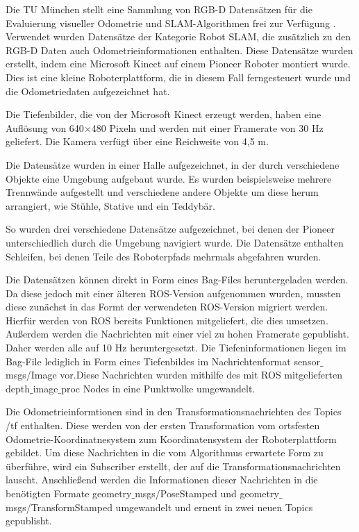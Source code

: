 Die TU München stellt eine Sammlung von RGB-D Datensätzen für die Evaluierung visueller Odometrie und SLAM-Algorithmen frei zur Verfügung \cite{Sturm2012}. Verwendet wurden Datensätze der Kategorie Robot SLAM, die zusätzlich zu den RGB-D Daten auch Odometrieinformationen enthalten. Diese Datensätze wurden erstellt, indem eine Microsoft Kinect auf einem Pioneer Roboter montiert wurde. Dies ist eine kleine Roboterplattform, die in diesem Fall ferngesteuert wurde und die Odometriedaten aufgezeichnet hat. 

Die Tiefenbilder, die von der Microsoft Kinect erzeugt werden, haben eine Auflösung von 640$\times$480 Pixeln und werden mit einer Framerate von 30 Hz geliefert. Die Kamera verfügt über eine Reichweite von 4,5 m.

Die Datensätze wurden in einer Halle aufgezeichnet, in der durch verschiedene Objekte eine Umgebung aufgebaut wurde. Es wurden beispielsweise mehrere Trennwände aufgestellt und verschiedene andere Objekte um diese herum arrangiert, wie Stühle, Stative und ein Teddybär. 

So wurden drei verschiedene Datensätze aufgezeichnet, bei denen der Pioneer unterschiedlich durch die Umgebung navigiert wurde. Die Datensätze enthalten Schleifen, bei denen Teile des Roboterpfads mehrmals abgefahren wurden. 

Die Datensätzen können direkt in Form eines Bag-Files heruntergeladen werden. Da diese jedoch mit einer älteren ROS-Version aufgenommen wurden, mussten diese zunächst in das Formt der verwendeten ROS-Version migriert werden. Hierfür werden von ROS bereits Funktionen mitgeliefert, die dies umsetzen. Außerdem werden die Nachrichten mit einer viel zu hohen Framerate gepublisht. Daher werden alle auf 10 Hz heruntergesetzt. Die Tiefeninformationen liegen im Bag-File lediglich in Form eines Tiefenbildes im Nachrichtenformat sensor$\_$msgs/Image vor.Diese Nachrichten wurden mithilfe des mit ROS mitgelieferten depth$\_$image$\_$proc Nodes in eine Punktwolke umgewandelt. 

Die Odometrieinformtionen sind in den Transformationsnachrichten des Topics /tf enthalten. Diese werden von der ersten Transformation vom ortsfesten Odometrie-Koordinatnesystem zum Koordinatensystem der Roboterplattform gebildet. Um diese Nachrichten in die vom Algorithmus erwartete Form zu überführe, wird ein Subscriber erstellt, der auf die Transformationsnachrichten lauscht. Anschließend werden die Informationen dieser Nachrichten in die benötigten Formate geometry$\_$msgs/PoseStamped und geometry$\_$msgs/TransformStamped umgewandelt und erneut in zwei neuen Topics gepublisht. 

